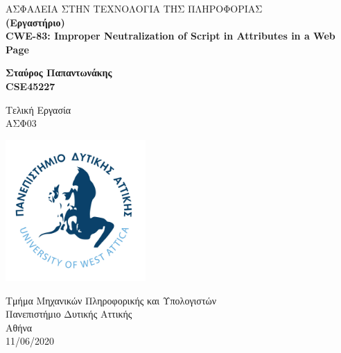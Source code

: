 %
%
%
\begin{titlepage}
	\begin{center}
		ΑΣΦΑΛΕΙΑ ΣΤΗΝ ΤΕΧΝΟΛΟΓΙΑ ΤΗΣ ΠΛΗΡΟΦΟΡΙΑΣ\\
		\textbf{(Εργαστήριο)}\\

		\vspace{1cm}	
		\Large%
		\textbf{CWE-83: Improper Neutralization of Script in Attributes in a Web Page}
		
		\vspace{0.5cm}
		\large
		
				
		\vspace{1.5cm}
		\textbf{Σταύρος Παπαντωνάκης\\ CSE45227}
		\vfill
		
		Τελική Εργασία\\
		ΑΣΦ03
		\vspace{0.8cm}
		\begin{center}
			\includegraphics[width=0.4\textwidth]{image/logo.jpg}		
		\end{center}
		\normalsize
		Τμήμα Μηχανικών Πληροφορικής και Υπολογιστών\\
		Πανεπιστήμιο Δυτικής Αττικής\\
		Αθήνα\\
		11/06/2020\\	
	\end{center}
\end{titlepage}